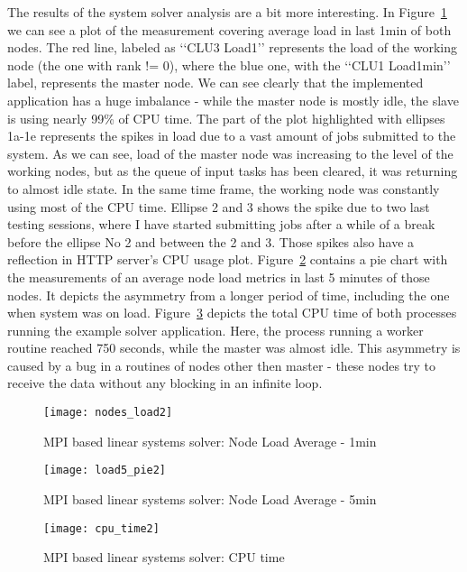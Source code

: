 The results of the system solver analysis are a bit more interesting. In Figure~\ref{fig:nodes_load2} we can see a plot of the measurement covering average load in last 1min of both nodes. The red line, labeled as \lq\lq{}CLU3 Load1\rq\rq{} represents the load of the working node (the one with rank != 0), where the blue one, with the \lq\lq{}CLU1 Load1min\rq\rq{} label, represents the master node. We can see clearly that the implemented application has a huge imbalance - while the master node is mostly idle, the slave is using nearly 99\% of CPU time. The part of the plot highlighted with ellipses 1a-1e represents the spikes in load due to a vast amount of jobs submitted to the system. As we can see, load of the master node was increasing to the level of the working nodes, but as the queue of input tasks has been cleared, it was returning to almost idle state. In the same time frame, the working node was constantly using most of the CPU time. Ellipse 2 and 3 shows the spike due to two last testing sessions, where I have started submitting jobs after a while of a break before the ellipse No 2 and between the 2 and 3. Those spikes also have a reflection in HTTP server\rq{}s CPU usage plot. Figure~\ref{fig:load5_pie2} contains a pie chart with the measurements of an average node load metrics in last 5 minutes of those nodes. It depicts the asymmetry from a longer period of time, including the one when system was on load. Figure~\ref{fig:total_cpu_time} depicts the total CPU time of both processes running the example solver application. Here, the process running a worker routine reached 750 seconds, while the master was almost idle. This asymmetry is caused by a bug in a routines of nodes other then master - these nodes try to receive the data without any blocking in an infinite loop.

\begin{figure}[ht]
\centering
\texttt{[image: nodes\_load2]}
\caption{MPI based linear systems solver: Node Load Average - 1min}
\label{fig:nodes_load2}
\end{figure}

\begin{figure}[ht]
\centering
\texttt{[image: load5\_pie2]}
\caption{MPI based linear systems solver: Node Load Average - 5min}
\label{fig:load5_pie2}
\end{figure}

\begin{figure}[ht]
\centering
\texttt{[image: cpu\_time2]}
\caption{MPI based linear systems solver: CPU time}
\label{fig:total_cpu_time}
\end{figure}
